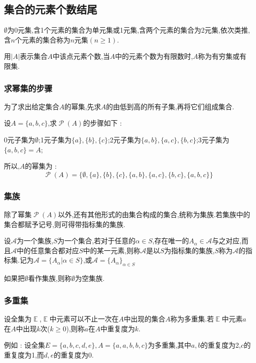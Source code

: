 \documentclass[UTF8,12pt]{ctexbook}
\newcommand{\absoluteValue}[1]{\left\lvert #1 \right\vert}
\newcommand{\powerSetOf}[1]{\powerSet (#1)}
\DeclareMathOperator{\mathEverythingCollection}{\mathbb{E}}
\DeclareMathOperator{\powerSet}{\mathcal{P}}
\begin{document}
{{{{\subsection{集合的元素个数结尾}{
  $\emptyset$为$0$元集,含1个元素的集合为单元集或1元集,含两个元素的集合为2元集,依次类推,含$n$个元素的集合称为$n$元集$(n \geq 1)$.

  用$\absoluteValue{A}$表示集合$A$中该点元素个数,当$A$中的元素个数为有限数时,$A$称为有穷集或有限集.
}%

\subsubsection{求幂集的步骤}{
  为了求出给定集合$A$的幂集,先求$A$的由低到高的所有子集,再将它们组成集合.

  设$A = \{a,b,c\}$,求$\powerSetOf{A}$的步骤如下 :

  0元子集为$\emptyset$;1元子集为$\{a\},\{b\},\{c\}$;2元子集为$\{a,b\},\{a,c\},\{b,c\}$;3元子集为$\{a,b,c\} = A$;

  所以,$A$的幂集为 : $$
    \powerSetOf{A} = \{\emptyset,\{a\},\{b\},\{c\},\{a,b\},\{a,c\},\{b,c\},\{a,b,c\}\}
  $$
}%

\subsubsection{集族}{
除了幂集$\powerSetOf{A}$以外,还有其他形式的由集合构成的集合,统称为集族.若集族中的集合都赋予记号,则可得带指标集的集族.

设$\mathcal{A}$为一个集族,$S$为一个集合,若对于任意的$\alpha \in S$,存在唯一的$A_\alpha \in \mathcal{A}$与之对应,而且$\mathcal{A}$中的任意集合都对应$S$中的某一元素,则称$\mathcal{A}$是以$S$为指标集的集族,$S$称为$\mathcal{A}$的指标集.记为$\mathcal{A} = \{A_\alpha | \alpha \in S\}$,或$\mathcal{A} = \{A_\alpha\}_{\alpha \in S}$

如果把$\emptyset$看作集族,则称$\emptyset$为空集族.
}%

\subsubsection{多重集}{
  设全集为$\mathEverythingCollection$,$\mathEverythingCollection$中元素可以不止一次在$A$中出现的集合$A$称为多重集.若$\mathEverythingCollection$中元素$a$在$A$中出现$k$次($k \geq 0$),则称$a$在$A$中重复度为$k$.

  例如 : 设全集$E = \{a,b,c,d,e\},A = \{a,a,b,b,c\}$为多重集,其中$a,b$的重复度为2,$c$的重复度为1,而$d,e$的重复度为0.

}}}}}
\end{document}
